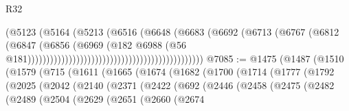 \begin{lexlean}{R32}
\begin{coremodule}
                                                                    (@5123
                                                                      (@5164
                                                                        (@5213
                                                                          (@6516
                                                                            (@6648
                                                                              (@6683
                                                                                (@6692
                                                                                  (@6713
                                                                                    (@6767
                                                                                      (@6812
                                                                                        (@6847
                                                                                          (@6856
                                                                                            (@6969
                                                                                              (@182
                                                                                                @6988
                                                                                                (@56
                                                                                                  @181)))))))))))))))))))))))))))))))))))))))))))))))
@7085 := @1475
    (@1487
      (@1510
        (@1579
          (@715
            (@1611
              (@1665
                (@1674
                  (@1682
                    (@1700
                      (@1714
                        (@1777
                          (@1792
                            (@2025
                              (@2042
                                (@2140
                                  (@2371
                                    (@2422
                                      (@692
                                        (@2446
                                          (@2458
                                            (@2475
                                              (@2482
                                                (@2489
                                                  (@2504
                                                    (@2629
                                                      (@2651
                                                        (@2660
                                                          (@2674

\end{coremodule}
\end{lexlean}
